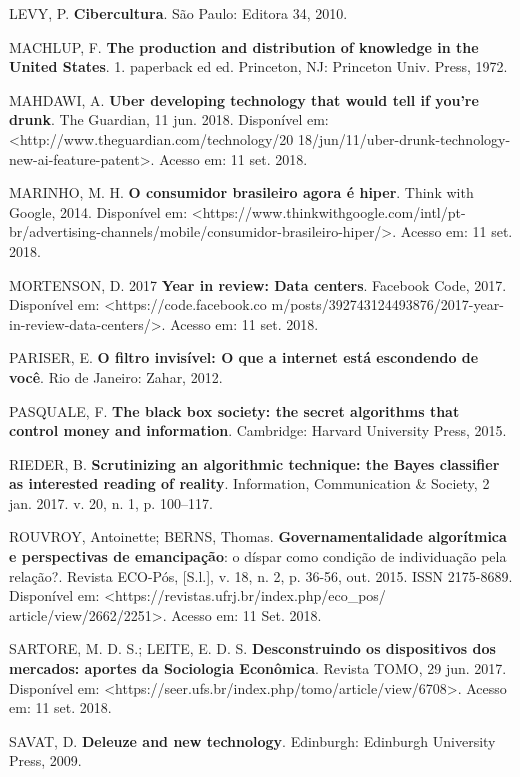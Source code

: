 LEVY, P. \textbf{Cibercultura}. São Paulo: Editora 34, 2010.

MACHLUP, F. \textbf{The production and distribution of knowledge in the
United States}. 1. paperback ed ed. Princeton, NJ: Princeton Univ.
Press, 1972.

MAHDAWI, A. \textbf{Uber developing technology that would tell if you're
drunk}. The Guardian, 11 jun. 2018. Disponível em:
\textless{}http://www.theguardian.com/technology/20
18/jun/11/uber-drunk-technology-new-ai-feature-patent\textgreater{}.
Acesso em: 11 set. 2018.

MARINHO, M. H. \textbf{O consumidor brasileiro agora é hiper}. Think
with Google, 2014. Disponível em:
\textless{}https://www.thinkwithgoogle.com/intl/pt-br/advertising-channels/mobile/consumidor-brasileiro-hiper/\textgreater{}.
Acesso em: 11 set. 2018.

MORTENSON, D. 2017 \textbf{Year in review: Data centers}. Facebook Code,
2017. Disponível em:
\textless{}https://code.facebook.co
m/posts/392743124493876/2017-year-in-review-data-centers/\textgreater{}.
Acesso em: 11 set. 2018.

PARISER, E. \textbf{O filtro invisível: O que a internet está escondendo
de você}. Rio de Janeiro: Zahar, 2012.

PASQUALE, F. \textbf{The black box society: the secret algorithms that
control money and information}. Cambridge: Harvard University Press,
2015.

RIEDER, B. \textbf{Scrutinizing an algorithmic technique: the Bayes
classifier as interested reading of reality}. Information, Communication
\& Society, 2 jan. 2017. v. 20, n. 1, p. 100--117.

ROUVROY, Antoinette; BERNS, Thomas. \textbf{Governamentalidade
algorítmica e perspectivas de emancipação}: o díspar como condição de
individuação pela relação?. Revista ECO-Pós, {[}S.l.{]}, v. 18, n. 2, p.
36-56, out. 2015. ISSN 2175-8689. Disponível em:
\textless{}https://revistas.ufrj.br/index.php/eco\_pos/
article/view/2662/2251\textgreater{}.
Acesso em: 11 Set. 2018.

SARTORE, M. D. S.; LEITE, E. D. S. \textbf{Desconstruindo os
dispositivos dos mercados: aportes da Sociologia Econômica}. Revista
TOMO, 29 jun. 2017. Disponível em:
\textless{}https://seer.ufs.br/index.php/tomo/article/view/6708\textgreater{}.
Acesso em: 11 set. 2018.

SAVAT, D. \textbf{Deleuze and new technology}. Edinburgh: Edinburgh
University Press, 2009.


